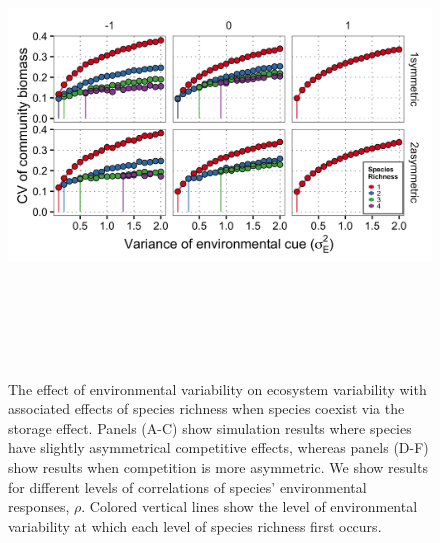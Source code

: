 \documentclass[12pt,]{article}
\begin{document}
\begin{figure}[!ht]
  \centering
      \includegraphics[height=5in]{./components/storage_effect_div+envar_varycomp.png}
  \caption{The effect of environmental variability on ecosystem variability with associated effects of species richness when species coexist via the storage effect. Panels (A-C) show simulation results where species have slightly asymmetrical competitive effects, whereas panels (D-F) show results when competition is more asymmetric. We show results for different levels of correlations of species' environmental responses, $\rho$. Colored vertical lines show the level of environmental variability at which each level of species richness first occurs.}
\end{figure}

\newpage{}
\end{document}
